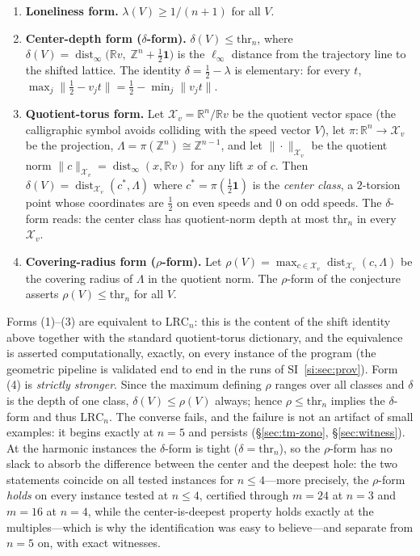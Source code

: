 \documentclass[11pt,a4paper]{article}
\numberwithin{equation}{section}
\theoremstyle{plain}
\theoremstyle{definition}
\theoremstyle{remark}
\newcommand{\Z}{\mathbb{Z}}
\newcommand{\R}{\mathbb{R}}
\newcommand{\wnc}[1]{\lVert #1 \rVert}
\newcommand{\lrc}{\mathrm{LRC}}
\begin{document}
\begin{enumerate}[leftmargin=1.6em,itemsep=2pt]
\item \textbf{Loneliness form.} $\lambda(V)\ge 1/(n+1)$ for all $V$.
\item \textbf{Center-depth form ($\delta$-form).}
$\delta(V)\le \mathrm{thr}_n$, where
$\delta(V)=\operatorname{dist}_\infty\!\bigl(\R v,\;\Z^n+\tfrac12\mathbf{1}\bigr)$
is the $\ell_\infty$ distance from the trajectory line to the shifted
lattice. The identity
$\delta=\tfrac12-\lambda$ is elementary: for every $t$,
$\max_j \wnc{\tfrac12-v_jt}=\tfrac12-\min_j\wnc{v_jt}$.
\item \textbf{Quotient-torus form.} Let $\mathcal{X}_v=\R^n/\R v$ be
the quotient vector space (the calligraphic symbol avoids colliding with
the speed vector $V$), let $\pi\colon\R^n\to\mathcal{X}_v$ be the
projection, $\Lambda=\pi(\Z^n)\cong\Z^{n-1}$, and let
$\|\cdot\|_{\mathcal{X}_v}$ be the quotient norm
$\|c\|_{\mathcal{X}_v}=\operatorname{dist}_\infty(x,\R v)$ for any lift
$x$ of $c$. Then $\delta(V)=\operatorname{dist}_{\mathcal{X}_v}(c^*,\Lambda)$
where $c^*=\pi(\tfrac12\mathbf{1})$ is the \emph{center class}, a
$2$-torsion point whose coordinates are $\tfrac12$ on even speeds and $0$
on odd speeds. The $\delta$-form reads: the center class has quotient-norm
depth at most $\mathrm{thr}_n$ in every $\mathcal{X}_v$.
\item \textbf{Covering-radius form ($\rho$-form).}
Let $\rho(V)=\max_{c\in\mathcal{X}_v}\operatorname{dist}_{\mathcal{X}_v}(c,
\Lambda)$ be the covering radius of $\Lambda$ in the quotient norm. The
$\rho$-form of the conjecture asserts $\rho(V)\le\mathrm{thr}_n$ for all
$V$.
\end{enumerate}

Forms (1)--(3) are equivalent to $\lrc_n$: this is the content of the
shift identity above together with the standard quotient-torus dictionary,
and the equivalence is asserted computationally, exactly, on every
instance of the program (the geometric pipeline is validated end to end
in the runs of SI~\ref{si:sec:prov}). Form (4) is \emph{strictly
stronger}. Since the maximum defining $\rho$ ranges over all classes and
$\delta$ is the depth of one class, $\delta(V)\le\rho(V)$ always; hence
$\rho\le\mathrm{thr}_n$ implies the $\delta$-form and thus $\lrc_n$. The
converse fails, and the failure is not an artifact of small examples: it
begins exactly at $n=5$ and persists (\S\ref{sec:tm-zono},
\S\ref{sec:witness}). At the harmonic instances the $\delta$-form is
tight ($\delta=\mathrm{thr}_n$), so the $\rho$-form has no slack to
absorb the difference between the center and the deepest hole: the
two statements coincide on all tested instances for $n\le 4$---more
precisely, the $\rho$-form \emph{holds} on every instance tested at
$n\le 4$, certified through $m=24$ at $n=3$ and $m=16$ at $n=4$, while
the center-is-deepest property holds exactly at the multiples---which is
why the identification was easy to believe---and separate from $n=5$ on,
with exact witnesses.
\end{document}
